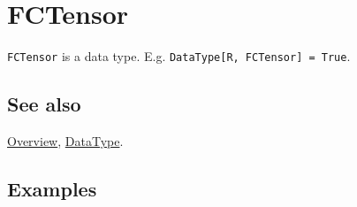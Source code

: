\documentclass[../FeynCalcManual.tex]{subfiles}
\begin{document}
\hypertarget{fctensor}{
\section{FCTensor}\label{fctensor}}

\texttt{FCTensor} is a data type. E.g.
\texttt{DataType[\allowbreak{}R,\ \allowbreak{}FCTensor] = True}.

\subsection{See also}

\hyperlink{toc}{Overview}, \hyperlink{datatype}{DataType}.

\subsection{Examples}
\end{document}
